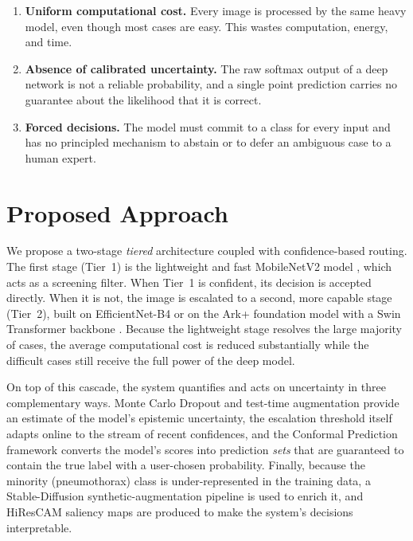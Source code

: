 \begin{enumerate}
    \item \textbf{Uniform computational cost.} Every image is processed by the same heavy model, even though most cases are easy. This wastes computation, energy, and time.
    \item \textbf{Absence of calibrated uncertainty.} The raw softmax output of a deep network is not a reliable probability, and a single point prediction carries no guarantee about the likelihood that it is correct.
    \item \textbf{Forced decisions.} The model must commit to a class for every input and has no principled mechanism to abstain or to defer an ambiguous case to a human expert.
\end{enumerate}

\section{Proposed Approach}
We propose a two-stage \emph{tiered} architecture coupled with confidence-based routing. The first stage (Tier~1) is the lightweight and fast MobileNetV2 model \cite{sandler2018mobilenetv2}, which acts as a screening filter. When Tier~1 is confident, its decision is accepted directly. When it is not, the image is escalated to a second, more capable stage (Tier~2), built on EfficientNet-B4 \cite{tan2019efficientnet} or on the Ark+ foundation model with a Swin Transformer backbone \cite{ma2023foundation, liu2021swin}. Because the lightweight stage resolves the large majority of cases, the average computational cost is reduced substantially while the difficult cases still receive the full power of the deep model.

On top of this cascade, the system quantifies and acts on uncertainty in three complementary ways. Monte Carlo Dropout \cite{gal2016dropout} and test-time augmentation provide an estimate of the model's epistemic uncertainty, the escalation threshold itself adapts online to the stream of recent confidences, and the Conformal Prediction framework \cite{shafer2008tutorial, vovk2005algorithmic} converts the model's scores into prediction \emph{sets} that are guaranteed to contain the true label with a user-chosen probability. Finally, because the minority (pneumothorax) class is under-represented in the training data, a Stable-Diffusion \cite{rombach2022high} synthetic-augmentation pipeline is used to enrich it, and HiResCAM \cite{draelos2020hirescam} saliency maps are produced to make the system's decisions interpretable.


